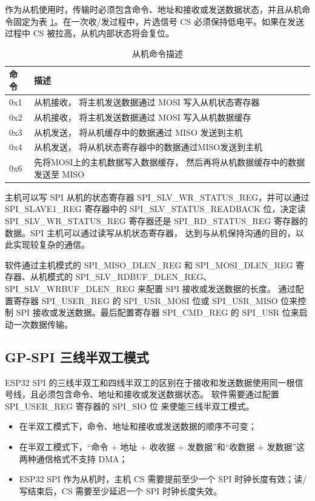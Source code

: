 \documentclass[main\_\_CN.tex]{subfiles}
\begin{document}
作为从机使用时，传输时必须包含命令、地址和接收或发送数据状态，并且从机命令固定为表 \ref{table:slave_cmd_description}。在一次收/发过程中，片选信号 CS 必须保持低电平。如果在发送过程中 CS 被拉高，从机内部状态将会复位。

\begin{table}[H]
    \centering
    \caption{从机命令描述}
    \label{table:slave_cmd_description}
    \begin{tabular}[c]{|p{1cm}|p{14cm}|}
    \hline
    \rowcolor{lightgray}
    命令 & 描述\\
    \hline
    0x1 & 从机接收， 将主机发送数据通过 MOSI 写入从机状态寄存器\\
    \hline
    0x2 & 从机接收， 将主机发送数据通过 MOSI 写入从机数据缓存\\
    \hline
    0x3 & 从机发送， 将从机缓存中的数据通过 MISO 发送到主机\\
    \hline
    0x4 & 从机发送， 将从机状态寄存器中的数据通过MISO发送到主机\\
    \hline
    0x6 & 先将MOSI上的主机数据写入数据缓存， 然后再将从机数据缓存中的数据发送至 MISO\\
    \hline
    \end{tabular}
\end{table}

主机可以写 SPI 从机的状态寄存器 SPI\_SLV\_WR\_STATUS\_REG，并可以通过 SPI\_SLAVE1\_REG 寄存器中的 SPI\_SLV\_STATUS\_READBACK 位，决定读 SPI\_SLV\_WR\_STATUS\_REG 寄存器还是 SPI\_RD\_STATUS\_REG 寄存器的数据。SPI 主机可以通过读写从机状态寄存器， 达到与从机保持沟通的目的，以此实现较复杂的通信。

软件通过主机模式的 SPI\_MISO\_DLEN\_REG 和 SPI\_MOSI\_DLEN\_REG 寄存器、从机模式的 SPI\_SLV\_RDBUF\_DLEN\_REG、SPI\_SLV\_WRBUF\_DLEN\_REG 来配置 SPI 接收或发送数据的长度。 通过配置寄存器 SPI\_USER\_REG 的 SPI\_USR\_MOSI 位或 SPI\_USR\_MISO 位来控制 SPI 接收或发送数据。最后配置寄存器 SPI\_CMD\_REG 的 SPI\_USR 位来启动一次数据传输。

\subsection{GP-SPI 三线半双工模式}
ESP32 SPI 的三线半双工和四线半双工的区别在于接收和发送数据使用同一根信号线，且必须包含命令、地址和接收或发送数据状态。 软件需要通过配置 SPI\_USER\_REG 寄存器的 SPI\_SIO 位 来使能三线半双工模式。


\begin{tiplisting}
\vspace{-2em}
\begin{itemize}
\item 在半双工模式下，命令、地址和接收或发送数据的顺序不可变；
\item 在半双工模式下，“命令 + 地址 + 收收据 + 发数据”和“收数据 + 发数据”这两种通信格式不支持 DMA；
\item ESP32 SPI 作为从机时，主机 CS 需要提前至少一个 SPI 时钟长度有效；读/写结束后，CS 需要至少延迟一个 SPI 时钟长度失效。
\end{itemize}
\end{tiplisting}
\end{document}
